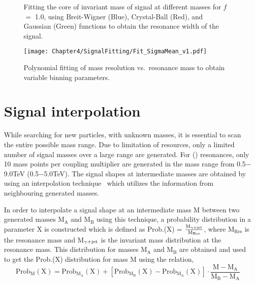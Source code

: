 \vspace{-0.1in}
\begin{figure}[htbp]
\centering
{} 
\caption{Fitting the core of invariant mass of \qstar signal at different masses for $f$ $=$ 1.0, using Breit-Wigner (Blue), Crystal-Ball (Red), and Gaussian
(Green) functions to obtain the resonance width of the signal.}
\label{fig:SigFitting}
\end{figure}

\vspace{-0.1in}
\begin{figure}[h!]
\centering
\texttt{[image: Chapter4/SignalFitting/Fit\_SigmaMean\_v1.pdf]}
 \caption{Polynomial fitting of mass resolution vs.\ resonance mass to obtain variable binning parameters.}
 \label{fig:MassResolution}
\end{figure}
\vspace{-0.1in}

\section{Signal interpolation}
While searching for new particles, with unknown masses, it is essential to scan the entire possible mass range. Due to limitation of resources, only a
limited number of signal masses over a large range are generated. For \qstar (\bstar) resonances, only 10 mass points per coupling multiplier are generated
in the mass range from 0.5$-$9.0\unit{TeV} (0.5$-$5.0\unit{TeV}). The signal shapes at intermediate masses are obtained by using an interpolation
technique~\cite{Interpolation} which utilizes the information from neighbouring generated masses. 

In order to interpolate a signal shape at an intermediate mass M between two generated masses M$_{\textrm{A}}$ and M$_{\textrm{B}}$ using this
technique, a probability distribution
in a parameter X is constructed which is defined as Prob.(X) = $\frac{\textrm{M}_{\gamma+\mathrm{jet}}}{\textrm{M}_{\textrm{Res}}}$, where M$_{\textrm{Res}}$ is the resonance
mass and M$_{\gamma+\mathrm{jet}}$ is the invariant mass distribution at the resonance mass. This distribution for masses M$_{\textrm{A}}$ and M$_{\textrm{B}}$
are obtained and used to get the Prob.(X) distribution for mass M using the relation,
\begin{equation}
  \textrm{Prob}_{\textrm{M}}(\textrm{X}) = \textrm{Prob}_{\textrm{M}_{\textrm{A}}}(\textrm{X}) + [ \textrm{Prob}_{\textrm{M}_{\textrm{B}}}(\textrm{X}) - \textrm{Prob}_{\textrm{M}_{\textrm{A}}}(\textrm{X}) ]
  \cdot \frac{\textrm{M} - \textrm{M}_{\textrm{A}}}{\textrm{M}_{\textrm{B}} - \textrm{M}_{\textrm{A}}}
\end{equation}

